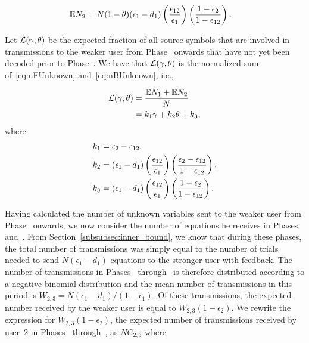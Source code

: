 \setcounter{cnt}{1}
\begin{align}
	\label{eq:nBUnknown}
	\mathbb{E}N_{2} &= N(1  - \theta)(\epsilon_1 - d_1)\left(\frac{\epsilon_{12}}{\epsilon_1}\right) \left(\frac{1 - \epsilon_2}{1 - \epsilon_{12}} \right).
\end{align}

Let $\mathcal{L}(\gamma, \theta)$ be the expected fraction of all source symbols that are involved in transmissions to the weaker user from Phase~ onwards that have not yet been decoded prior to Phase~.  We have that $\mathcal{L}(\gamma, \theta)$ is the normalized sum of~\eqref{eq:nFUnknown} and~\eqref{eq:nBUnknown}, i.e., 

\begin{align}
	\mathcal{L}(\gamma, \theta) &= \frac{\mathbb{E}N_{1} + \mathbb{E}N_{2}}{N} \\
	&= k_1 \gamma + k_2 \theta	+ k_3,
	\label{eq:LHSfuncparam}
\end{align}
where 
\begin{subequations}
\begin{align}
	k_1 &= \epsilon_2 - \epsilon_{12}, \label{eq:kgamma} \\	
	k_2 &= (\epsilon_1 - d_1) \left(\frac{\epsilon_{12}}{\epsilon_1}\right) \left(\frac{\epsilon_2 - \epsilon_{12}}{1 - \epsilon_{12}} \right), 	\label{eq:komega}\\
	k_3 &= (\epsilon_1 - d_1) \left(\frac{\epsilon_{12}}{\epsilon_1}\right) \left(\frac{1 - \epsilon_2}{1 - \epsilon_{12}} \right).
	\label{eq:kk}
\end{align}
\end{subequations}

Having calculated the number of unknown variables sent to the weaker user from Phase~ onwards, we now consider the number of equations he receives in Phases~ and~.  From Section~\ref{subsubsec:inner_bound}, we know that during these phases, the total number of transmissions was simply equal to the number of trials needed to send $N(\epsilon_1 - d_1)$ equations to the stronger user with feedback.  The number of transmissions in Phases~ through~  is therefore distributed according to a negative binomial distribution and the mean number of transmissions in this period is $W_{2,3} = N(\epsilon_1 - d_1)/(1 -\epsilon_1)$.  Of these transmissions, the expected number received by the weaker user is equal to $W_{2, 3}(1 - \epsilon_2)$.  We rewrite the expression for $W_{2, 3}(1 - \epsilon_2)$, the expected number of transmissions received by user~2 in Phases~ through~, as $NC_{2, 3}$ where

